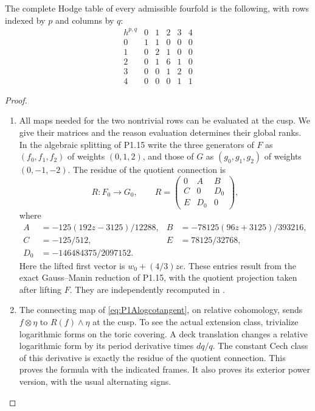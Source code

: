 \begin{theorem}\label{night:P1A.2}
The complete Hodge table of every admissible fourfold is the
following, with rows indexed by $p$ and columns by $q$:
\[
\begin{array}{c|ccccc}
h^{p,q}&0&1&2&3&4\\\hline
0&1&1&0&0&0\\
1&0&2&1&0&0\\
2&0&1&6&1&0\\
3&0&0&1&2&0\\
4&0&0&0&1&1
\end{array}
\]
\end{theorem}
\begin{proof}
\begin{enumerate}[label=\arabic*.]
\item All maps needed for the two nontrivial rows can be evaluated at
the cusp. We give their matrices and the reason evaluation
determines their global ranks. In the algebraic splitting of
P1.15 write the three generators of $F$ as $(f_0,f_1,f_2)$ of
weights $(0,1,2)$, and those of $G$ as $(g_0,g_1,g_2)$ of
weights $(0,-1,-2)$. The residue of the quotient connection is
\[
R:F_0\longrightarrow G_0,\qquad
R=\begin{pmatrix}0&A&B\\C&0&D_0\\E&D_0&0\end{pmatrix},
\]
where
\begin{align*}
A&=-125(192z-3125)/12288,&
B&=-78125(96z+3125)/393216,\\
C&=-125/512,&E&=78125/32768,\\
D_0&=-146484375/2097152.
\end{align*}
Here the lifted first vector is $w_0+(4/3)ze$.
These entries result from the exact Gauss--Manin reduction of
P1.15, with the quotient projection taken after lifting $F$.
They are independently recomputed in
.

\item The connecting map of \eqref{eq:P1Alogcotangent}, on relative
cohomology, sends $f\otimes\eta$ to $R(f)\wedge\eta$ at the
cusp. To see the actual extension class, trivialize logarithmic
forms on the toric covering. A deck translation changes a
relative logarithmic form by its period derivative times
$dq/q$. The constant Cech class of this derivative is exactly
the residue of the quotient connection. This proves the
formula with the indicated frames. It also proves its exterior
power version, with the usual alternating signs.


\end{enumerate}
\end{proof}
